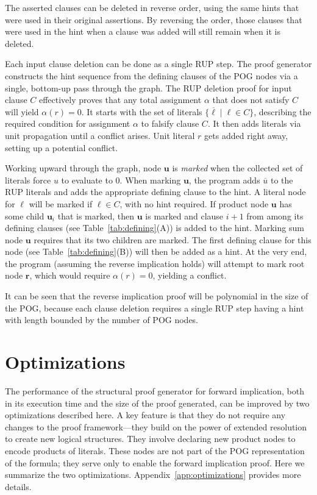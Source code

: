 \documentclass[letterpaper,USenglish,cleveref, autoref, thm-restate]{lipics-v2021}
\newcommand{\obar}[1]{\overline{#1}}
\newcommand{\lit}{\ell}
\newcommand{\assign}{\alpha}
\newcommand{\makenode}[1]{\mathbf{#1}}
\newcommand{\nodeu}{\makenode{u}}
\newcommand{\noder}{\makenode{r}}
\begin{document}
The asserted clauses can be deleted in reverse order, using the same
hints that were used in their original assertions.  By reversing the
order, those clauses that were used in the hint when a clause was
added will still remain when it is deleted.

Each input clause deletion can be done as a single RUP step.  The
proof generator constructs the hint sequence from the defining
clauses of the POG nodes via a single, bottom-up pass through the
graph.  The RUP deletion proof for input clause $C$ effectively proves that any
total assignment $\assign$ that does not satisfy $C$ will yield
$\assign(r) = 0$.  It starts with the set of literals
$\{ \obar{\lit} \mid \lit \in C\}$, describing the required condition for
assignment $\assign$ to falsify clause $C$.
It then
adds literals via unit propagation until a
conflict arises.    Unit literal $r$ gets
added right away, setting up a potential conflict.

Working upward through the graph, node $\nodeu$ is {\em marked} when
the collected set of literals force $u$ to evaluate to $0$.  When marking $\nodeu$, the
program adds $\obar{u}$ to the RUP literals and adds the appropriate
defining clause to the hint.  A literal node for
$\lit$ will be marked if $\lit \in C$, with no hint required.  If
product node $\nodeu$ has some child $\nodeu_i$ that is marked, then
$\nodeu$ is marked and clause $i+1$ from among its defining clauses (see Table~\ref{tab:defining}(A)) is
added to the hint.  Marking sum node $\nodeu$ requires that its two children are marked.
The first defining
clause for this node (see Table~\ref{tab:defining}(B)) will then be added as a hint.  At the very end, the program
(assuming the reverse implication holds) will attempt to mark root
node $\noder$, which would require $\assign(r) = 0$, yielding a
conflict.

It can be seen that the reverse implication proof will be polynomial in the size of the POG\@, because
each clause deletion requires a single RUP step having a hint with length
bounded by the number of POG nodes.

\section{Optimizations}

The performance of the structural proof generator for forward implication, both in its execution time and
the size of the proof generated, can be improved by two optimizations
described here.  A key feature is that they do not require any changes
to the proof framework---they build on the power of extended
resolution to create new logical structures.  They
involve declaring new product nodes to encode products of literals.
These nodes are not part of the POG
representation of the formula; they serve only to enable the forward
implication proof.  Here we summarize the two optimizations.
Appendix~\ref{app:optimizations} provides more details.
\end{document}
